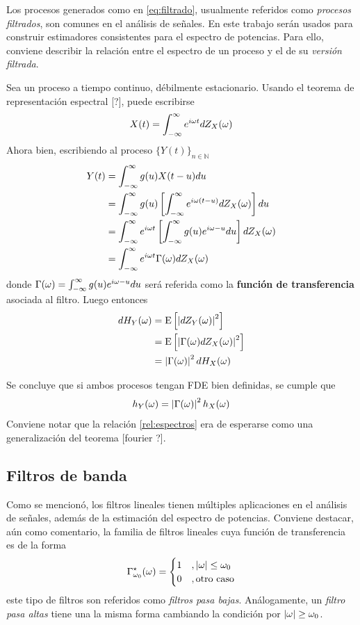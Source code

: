 Los procesos generados como en \ref{eq:filtrado}, usualmente referidos como \textit{procesos filtrados}, son comunes en el análisis de señales. 
%
En este trabajo serán usados para construir estimadores consistentes para el espectro de potencias.
%
Para ello, conviene describir la relación entre el espectro de un proceso y el de su \textit{versión filtrada}.

Sea \xt un proceso a tiempo continuo, débilmente estacionario. Usando el teorema de representación espectral [?], puede escribirse
\begin{equation}
X(t) = \int_{-\infty}^{\infty} e^{i \omega t }  dZ_X(\omega)
\end{equation}
Ahora bien, escribiendo al proceso $\{Y(t)\}_{n\in \mathbb{N}}$
\begin{align*}
Y(t) &= \int_{-\infty}^{\infty} g(u) X(t-u) du \\
&= \int_{-\infty}^{\infty} g(u) \left[ \int_{-\infty}^{\infty} e^{i \omega (t-u) }  dZ_X(\omega) \right] du \\
&= \int_{-\infty}^{\infty} e^{i \omega t } \left[ \int_{-\infty}^{\infty} g(u) e^{i \omega -u } du \right] dZ_X(\omega) \\
&= \int_{-\infty}^{\infty} e^{i \omega t } \Gamma(\omega) dZ_X(\omega)
\end{align*}
donde $\Gamma(\omega) = \int_{-\infty}^{\infty} g(u) e^{i \omega -u } du$ será referida como la \textbf{función de transferencia} asociada al filtro. 
%
Luego entonces
\begin{align*}
dH_Y(\omega) &= \mathrm{E}\left[ \left| dZ_Y(\omega) \right|^{2} \right]  \\
&= \mathrm{E}\left[ \left| \Gamma(\omega) dZ_X(\omega) \right|^{2} \right]  \\
&= \left| \Gamma(\omega) \right|^{2} dH_X(\omega)
\end{align*}

Se concluye que si ambos procesos tengan FDE bien definidas, se cumple que
\begin{equation}
h_Y(\omega) = \left| \Gamma(\omega) \right|^{2} h_X(\omega)
\label{rel:espectros}
\end{equation}
Conviene notar que la relación \ref{rel:espectros} era de esperarse como una generalización del teorema [fourier ?].

\subsection{Filtros de banda}

Como se mencionó, los filtros lineales tienen múltiples aplicaciones en el análisis de señales, además de la estimación del espectro de potencias.
%
Conviene destacar, aún como comentario, la familia de filtros lineales cuya función de transferencia es de la forma
\begin{equation}
\Gamma_{\omega_0}^{\star} (\omega) = \begin{cases}
1 &, \left| \omega \right| \leq \omega_0 \\
0 &, \text{otro caso}
\end{cases}
\end{equation}
este tipo de filtros son referidos como \textit{filtros pasa bajas}.
%
Análogamente, un \textit{filtro pasa altas} tiene una la misma forma cambiando la condición por $\left| \omega \right| \geq \omega_0$.

